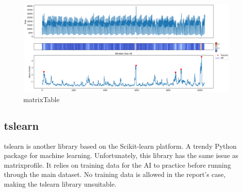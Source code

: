 \begin{figure}
\centering
\includegraphics[scale=0.40]{images/examples_NYC_Taxis_8_2.png}
\caption{matrixTable}
\label{matrixTable}
\end{figure}

\subsection{tslearn}
tslearn is another library based on the Scikit-learn platform. A trendy Python package for machine learning. Unfortunately, this library has the same issue as matrixprofile. It relies on training data for the AI to practice before running through the main dataset. No training data is allowed in the report's case, making the tslearn library unsuitable.  
